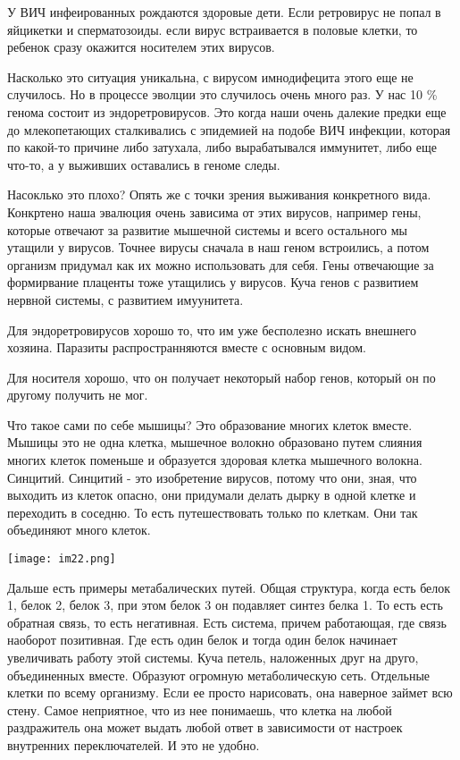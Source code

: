 У ВИЧ инфеированных рождаются здоровые дети. Если ретровирус не попал в яйцикетки и сперматозоиды.
если вирус встраивается в половые клетки, то ребенок сразу окажится носителем этих
вирусов.

Насколько это ситуация уникальна, с вирусом имнодифецита этого еще не случилось. Но
в процессе эволции это случилось очень много раз. У нас 10 \%  генома 
состоит из эндоретровирусов. Это когда наши очень далекие предки еще до млекопетающих 
сталкивались с эпидемией на подобе ВИЧ инфекции, которая по какой-то причине либо затухала, 
либо вырабатывался иммунитет, либо еще что-то, а у выживших 
оставались в геноме следы. 

Насоклько это плохо?
Опять же с точки зрения выживания конкретного вида. Конкртено 
наша эвалюция очень зависима от этих вирусов, например гены, которые 
отвечают за развитие мышечной системы и всего остального мы утащили у вирусов. 
Точнее вирусы сначала в наш геном встроились, а потом организм придумал как их можно 
использовать для себя. Гены отвечающие за формирвание плаценты тоже 
утащились у вирусов. Куча генов с развитием нервной системы, 
с развитием имуунитета. 

Для эндоретровирусов хорошо то, что им уже бесполезно искать внешнего хозяина. 
Паразиты распространняются вместе с основным видом. 

Для носителя хорошо, что он получает некоторый набор генов,
который он по другому получить не мог. 

Что такое сами по себе мышицы? Это образование многих 
клеток вместе. Мышицы это не одна клетка, мышечное 
волокно образовано путем слияния многих клеток поменьше 
и образуется здоровая клетка мышечного волокна. Синцитий. 
Синцитий - это изобретение вирусов, потому что они, зная, 
что выходить из клеток опасно, они придумали делать 
дырку в одной клетке и переходить в соседню. То есть путешествовать только 
по клеткам. Они так объединяют много клеток. 

\texttt{[image: im22.png]}

Дальше есть примеры метабалических путей. Общая структура, когда 
есть белок 1, белок 2, белок 3, при этом белок 3 он подавляет синтез белка 1. 
То есть есть обратная связь, то есть негативная. Есть система, причем работающая, 
где связь наоборот позитивная. Где есть один белок и 
тогда один белок начинает увеличивать работу этой системы. Куча петель, наложенных 
друг на друго, объединенных вместе. Образуют огромную метаболическую сеть. Отдельные клетки 
по всему организму. Если ее просто нарисовать, она наверное займет всю стену. Самое 
неприятное, что из нее понимаешь, что клетка на любой раздражитель она может выдать 
любой ответ в зависимости от настроек внутренних переключателей. И это не удобно. 

